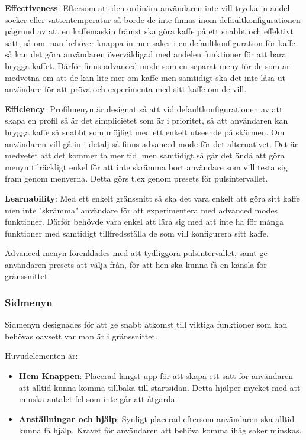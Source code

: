 \textbf{Effectiveness}: Eftersom att den ordinära användaren inte vill trycka in andel socker eller vattentemperatur så borde de inte finnas inom defaultkonfigurationen pågrund av att en kaffemaskin främst ska göra kaffe på ett snabbt och effektivt sätt, så om man behöver knappa in mer saker i en defaultkonfiguration för kaffe så kan det göra användaren överväldigad med andelen funktioner för att bara brygga kaffet. Därför finns advanced mode som en separat meny för de som är medvetna om att de kan lite mer om kaffe men samtidigt ska det inte låsa ut användare för att pröva och experimenta med sitt kaffe om de vill.

\textbf{Efficiency}: Profilmenyn är designat så att vid defaultkonfigurationen av att skapa en profil så är det simplicietet som är i prioritet, så att användaren kan brygga kaffe så snabbt som möjligt med ett enkelt utseende på skärmen. Om användaren vill gå in i detalj så finns advanced mode för det alternativet. Det är medvetet att det kommer ta mer tid, men samtidigt så går det ändå att göra menyn tilräckligt enkel för att inte skrämma bort användare som vill testa sig fram genom menyerna. Detta görs t.ex genom presets för pulsintervallet.

\textbf{Learnability}: Med ett enkelt gränssnitt så ska det vara enkelt att göra sitt kaffe men inte "skrämma" användare för att experimentera med advanced modes funktioner. Därför behövde vara enkel att lära sig med att inte ha för många funktioner med samtidigt tillfredsställa de som vill konfigurera sitt kaffe.

Advanced menyn förenklades med att tydliggöra pulsintervallet, samt ge användaren presets att välja från, för att hen ska kunna få en känsla för gränssnittet.


\subsubsection{Sidmenyn}
Sidmenyn designades för att ge snabb åtkomst till viktiga funktioner som kan behövas oavsett var man är i gränssnittet.  

Huvudelementen är:
\begin{itemize}
    \item \textbf{Hem Knappen}: Placerad längst upp för att skapa ett sätt för användaren att alltid kunna komma tillbaka till startsidan. Detta hjälper mycket med att minska antalet fel som inte går att åtgärda. 
    \item \textbf{Anställningar och hjälp}: Synligt placerad eftersom användaren ska alltid kunna få hjälp. Kravet för användaren att behöva komma ihåg saker minskas.
\end{itemize}



